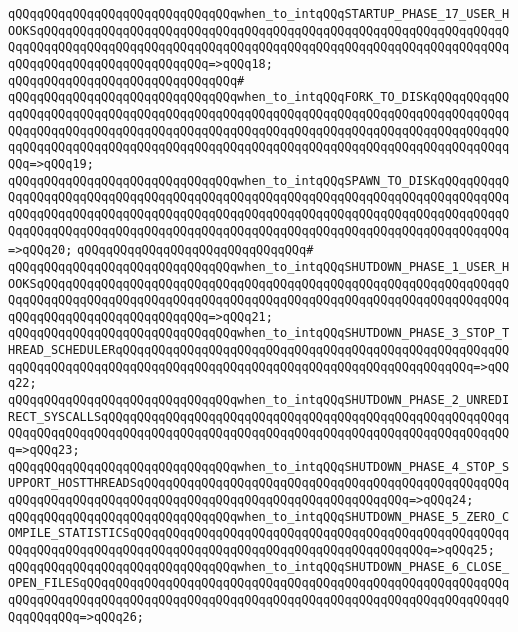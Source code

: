 \verb|qQQqqQQqqQQqqQQqqQQqqQQqqQQqqQQqwhen_to_intqQQqSTARTUP_PHASE_17_USER_HOOKSqQQqqQQqqQQqqQQqqQQqqQQqqQQqqQQqqQQqqQQqqQQqqQQqqQQqqQQqqQQqqQQqqQQqqQQqqQQqqQQqqQQqqQQqqQQqqQQqqQQqqQQqqQQqqQQqqQQqqQQqqQQqqQQqqQQqqQQqqQQqqQQqqQQqqQQqqQQqqQQqqQQq=>qQQq18;|\newline
\verb|qQQqqQQqqQQqqQQqqQQqqQQqqQQqqQQq#|\newline
\verb|qQQqqQQqqQQqqQQqqQQqqQQqqQQqqQQqwhen_to_intqQQqFORK_TO_DISKqQQqqQQqqQQqqQQqqQQqqQQqqQQqqQQqqQQqqQQqqQQqqQQqqQQqqQQqqQQqqQQqqQQqqQQqqQQqqQQqqQQqqQQqqQQqqQQqqQQqqQQqqQQqqQQqqQQqqQQqqQQqqQQqqQQqqQQqqQQqqQQqqQQqqQQqqQQqqQQqqQQqqQQqqQQqqQQqqQQqqQQqqQQqqQQqqQQqqQQqqQQqqQQqqQQqqQQqqQQqqQQq=>qQQq19;|\newline
\verb|qQQqqQQqqQQqqQQqqQQqqQQqqQQqqQQqwhen_to_intqQQqSPAWN_TO_DISKqQQqqQQqqQQqqQQqqQQqqQQqqQQqqQQqqQQqqQQqqQQqqQQqqQQqqQQqqQQqqQQqqQQqqQQqqQQqqQQqqQQqqQQqqQQqqQQqqQQqqQQqqQQqqQQqqQQqqQQqqQQqqQQqqQQqqQQqqQQqqQQqqQQqqQQqqQQqqQQqqQQqqQQqqQQqqQQqqQQqqQQqqQQqqQQqqQQqqQQqqQQqqQQqqQQqqQQqqQQq=>qQQq20;|\newline
\verb|qQQqqQQqqQQqqQQqqQQqqQQqqQQqqQQq#|\newline
\verb|qQQqqQQqqQQqqQQqqQQqqQQqqQQqqQQqwhen_to_intqQQqSHUTDOWN_PHASE_1_USER_HOOKSqQQqqQQqqQQqqQQqqQQqqQQqqQQqqQQqqQQqqQQqqQQqqQQqqQQqqQQqqQQqqQQqqQQqqQQqqQQqqQQqqQQqqQQqqQQqqQQqqQQqqQQqqQQqqQQqqQQqqQQqqQQqqQQqqQQqqQQqqQQqqQQqqQQqqQQqqQQqqQQqqQQq=>qQQq21;|\newline
\verb|qQQqqQQqqQQqqQQqqQQqqQQqqQQqqQQqwhen_to_intqQQqSHUTDOWN_PHASE_3_STOP_THREAD_SCHEDULERqQQqqQQqqQQqqQQqqQQqqQQqqQQqqQQqqQQqqQQqqQQqqQQqqQQqqQQqqQQqqQQqqQQqqQQqqQQqqQQqqQQqqQQqqQQqqQQqqQQqqQQqqQQqqQQqqQQqqQQq=>qQQq22;|\newline
\verb|qQQqqQQqqQQqqQQqqQQqqQQqqQQqqQQqwhen_to_intqQQqSHUTDOWN_PHASE_2_UNREDIRECT_SYSCALLSqQQqqQQqqQQqqQQqqQQqqQQqqQQqqQQqqQQqqQQqqQQqqQQqqQQqqQQqqQQqqQQqqQQqqQQqqQQqqQQqqQQqqQQqqQQqqQQqqQQqqQQqqQQqqQQqqQQqqQQqqQQqqQQq=>qQQq23;|\newline
\verb|qQQqqQQqqQQqqQQqqQQqqQQqqQQqqQQqwhen_to_intqQQqSHUTDOWN_PHASE_4_STOP_SUPPORT_HOSTTHREADSqQQqqQQqqQQqqQQqqQQqqQQqqQQqqQQqqQQqqQQqqQQqqQQqqQQqqQQqqQQqqQQqqQQqqQQqqQQqqQQqqQQqqQQqqQQqqQQqqQQqqQQqqQQq=>qQQq24;|\newline
\verb|qQQqqQQqqQQqqQQqqQQqqQQqqQQqqQQqwhen_to_intqQQqSHUTDOWN_PHASE_5_ZERO_COMPILE_STATISTICSqQQqqQQqqQQqqQQqqQQqqQQqqQQqqQQqqQQqqQQqqQQqqQQqqQQqqQQqqQQqqQQqqQQqqQQqqQQqqQQqqQQqqQQqqQQqqQQqqQQqqQQqqQQqqQQq=>qQQq25;|\newline
\verb|qQQqqQQqqQQqqQQqqQQqqQQqqQQqqQQqwhen_to_intqQQqSHUTDOWN_PHASE_6_CLOSE_OPEN_FILESqQQqqQQqqQQqqQQqqQQqqQQqqQQqqQQqqQQqqQQqqQQqqQQqqQQqqQQqqQQqqQQqqQQqqQQqqQQqqQQqqQQqqQQqqQQqqQQqqQQqqQQqqQQqqQQqqQQqqQQqqQQqqQQqqQQqqQQqqQQq=>qQQq26;|\newline
